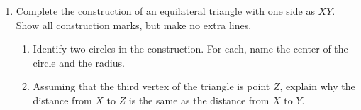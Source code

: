 \documentclass[12pt, twoside]{article}
\begin{document}
\begin{enumerate}
\newpage
\item Complete the construction of an equilateral triangle with one side as $\overline{XY}$. Show all construction marks, but make no extra lines. \vspace{3cm}
    \begin{center}
    \end{center} \vspace{3cm}
    \begin{enumerate}
      \item Identify two circles in the construction. For each, name the center of the circle and the radius.  \vspace{3cm}
      \item Assuming that the third vertex of the triangle is point $Z$, explain why the distance from $X$ to $Z$ is the same as the distance from $X$ to $Y$.
    \end{enumerate}


\end{enumerate}
\end{document}
